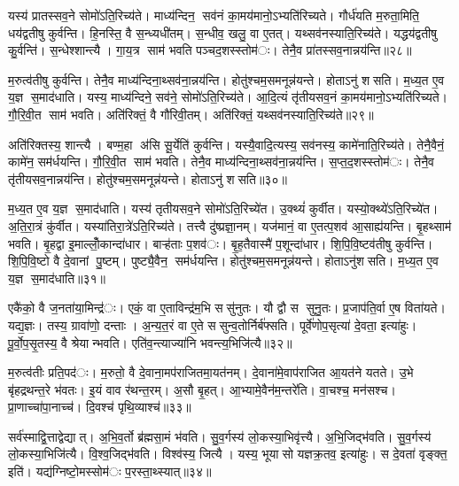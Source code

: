 यस्य॑ प्रातस्सव॒ने सोमो॑ऽति॒रिच्य॑ते। माध्य॑न्दिन॒ सव॑नं का॒मय॑मानो॒ऽभ्यति॑रिच्यते। गौर्ध॑यति म॒रुता॒मिति॒ धय॑द्वतीषु कुर्वन्ति। हि॒नस्ति॒ वै स॒न्ध्यधी॑तम्। स॒न्धीव॒ खलु॒ वा ए॒तत्। यथ्सव॑नस्याति॒रिच्य॑ते। यद्धय॑द्वतीषु कु॒र्वन्ति॑। स॒न्धेश्शान्त्यै। गा॒य॒त्र साम॑ भवति पञ्चद॒शस्स्तोम॑ः। तेनै॒व प्रा॑तस्सव॒नान्नय॑न्ति॥२८॥

म॒रुत्व॑तीषु कुर्वन्ति। तेनै॒व माध्य॑न्दिना॒थ्सव॑ना॒न्नय॑न्ति। होतु॑श्चम॒समनून्न॑यन्ते। होताऽनु॑ शसति। म॒ध्य॒त ए॒व य॒ज्ञ स॒माद॑धाति। यस्य॒ माध्य॑न्दिने॒ सव॑ने॒ सोमो॑ऽति॒रिच्य॑ते। आ॒दि॒त्यं तृ॑तीयसव॒नं का॒मय॑मानो॒ऽभ्यति॑रिच्यते। गौ॒रि॒वी॒त साम॑ भवति। अति॑रिक्तं॒ वै गौ॑रिवी॒तम्। अति॑रिक्तं॒ यथ्सव॑नस्याति॒रिच्य॑ते॥२९॥

अति॑रिक्तस्य॒ शान्त्यै। बण्म॒हा अ॑सि सू॒र्येति॑ कुर्वन्ति। यस्यै॒वादि॒त्यस्य॒ सव॑नस्य॒ कामे॑नाति॒रिच्य॑ते। तेनै॒वैनं॒ कामे॑न॒ सम॑र्धयन्ति। गौ॒रि॒वी॒त साम॑ भवति। तेनै॒व माध्य॑न्दिना॒थ्सव॑ना॒न्नय॑न्ति। स॒प्त॒द॒शस्स्तोम॑ः। तेनै॒व तृ॑तीयसव॒नान्नय॑न्ति। होतु॑श्चम॒समनून्न॑यन्ते। होताऽनु॑ शसति॥३०॥

म॒ध्य॒त ए॒व य॒ज्ञ स॒माद॑धाति। यस्य॑ तृतीयसव॒ने सोमो॑ऽति॒रिच्ये॑त। उ॒क्थ्यं॑ कुर्वीत। यस्यो॒क्थ्ये॑ऽति॒रिच्ये॑त। अ॒ति॒रा॒त्रं कु॑र्वीत। यस्या॑तिरा॒त्रे॑ऽति॒रिच्य॑ते। तत्त्वै दु॑ष्प्रज्ञा॒नम्। यज॑मानं॒ वा ए॒तत्प॒शव॑ आ॒साह्य॑यन्ति। बृ॒हथ्साम॑ भवति। बृ॒हद्वा इ॒माल्लोँ॒कान्दा॑धार। बाऱ्ह॑ताः प॒शव॑ः। बृ॒ह॒तैवास्मै॑ प॒शून्दा॑धार। शि॒पि॒वि॒ष्टव॑तीषु कुर्वन्ति। शि॒पि॒वि॒ष्टो वै दे॒वानां पु॒ष्टम्। पुष्ट्यै॒वैन॒ सम॑र्धयन्ति। होतु॑श्चम॒समनून्न॑यन्ते। होताऽनु॑शसति। म॒ध्य॒त ए॒व य॒ज्ञ स॒माद॑धाति॥३१॥


एकै॑को॒ वै ज॒नता॑या॒मिन्द्र॑ः। एकं॒ वा ए॒ताविन्द्र॑म॒भि ससु॑नुतः। यौ द्वौ स सुनु॒तः। प्र॒जाप॑ति॒र्वा ए॒ष विता॑यते। यद्य॒ज्ञः। तस्य॒ ग्रावा॑णो॒ दन्ताः। अ॒न्य॒त॒रं वा ए॒ते ससुन्व॒तोर्निर्ब॑फ्सति। पूर्वे॑णोप॒सृत्या॑ दे॒वता॒ इत्या॑हुः। पू॒र्वो॒प॒सृ॒तस्य॒ वै श्रेयान्भवति। एति॑व॒न्त्याज्या॑नि भवन्त्य॒भिजि॑त्यै॥३२॥

म॒रुत्व॑तीः प्रति॒पद॑ः। म॒रुतो॒ वै दे॒वाना॒मप॑राजितमा॒यत॑नम्। दे॒वाना॑मे॒वाप॑राजित आ॒यत॑ने यतते। उ॒भे बृ॑हद्रथन्त॒रे भ॑वतः। इ॒यं वाव र॑थन्त॒रम्। अ॒सौ बृ॒हत्। आ॒भ्यामे॒वैन॑म॒न्तरे॑ति। वा॒चश्च॒ मन॑सश्च। प्रा॒णाच्चा॑पा॒नाच्च॑। दि॒वश्च॑ पृथि॒व्याश्च॑॥३३॥

सर्व॑स्माद्वि॒त्ताद्वेद्यात्। अ॒भि॒व॒र्तो ब्र॑ह्मसा॒मं भ॑वति। सु॒व॒र्गस्य॑ लो॒कस्या॒भिवृ॑त्त्यै। अ॒भि॒जिद्भ॑वति। सु॒व॒र्गस्य॑ लो॒कस्या॒भिजि॑त्यै। वि॒श्व॒जिद्भ॑वति। विश्व॑स्य॒ जित्यै। यस्य॒ भूयासो यज्ञक्र॒तव॒ इत्या॑हुः। स दे॒वता॑ वृङ्क्त॒ इति॑। यद्य॑ग्निष्टो॒मस्सोम॑ः प॒रस्ता॒थ्स्यात्॥३४॥

